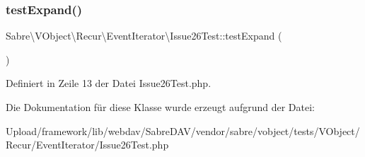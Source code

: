 \subsubsection{\texorpdfstring{test\+Expand()}{testExpand()}}
{\footnotesize\ttfamily Sabre\textbackslash{}\+V\+Object\textbackslash{}\+Recur\textbackslash{}\+Event\+Iterator\textbackslash{}\+Issue26\+Test\+::test\+Expand (\begin{DoxyParamCaption}{ }\end{DoxyParamCaption})}



Definiert in Zeile 13 der Datei Issue26\+Test.\+php.



Die Dokumentation für diese Klasse wurde erzeugt aufgrund der Datei\+:\begin{DoxyCompactItemize}
\item 
Upload/framework/lib/webdav/\+Sabre\+D\+A\+V/vendor/sabre/vobject/tests/\+V\+Object/\+Recur/\+Event\+Iterator/Issue26\+Test.\+php\end{DoxyCompactItemize}
